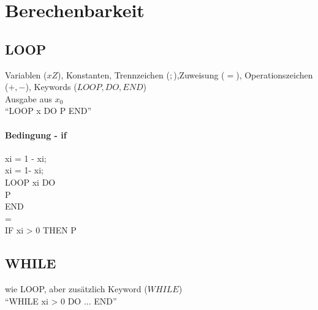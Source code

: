 
\section{Berechenbarkeit}
%
%
%
%
%
%
%
%
%

\subsection{LOOP}
Variablen (\(xZ\)), Konstanten, Trennzeichen (\(;\)),Zuweisung (\(=\)), Operationszeichen (\(+,-\)), Keywords (\(LOOP, DO, END\))\\
Ausgabe aus \(x_0\)\\
``LOOP x DO P END''
\paragraph{Bedingung - if}
xi = 1 - xi;\\
xi = 1- xi;\\
LOOP xi DO\\
	P\\
END\\
= \\
IF xi > 0 THEN P\\

\subsection{WHILE}
wie LOOP, aber zusätzlich Keyword (\(WHILE\))\\
``WHILE xi > 0 DO ... END''
